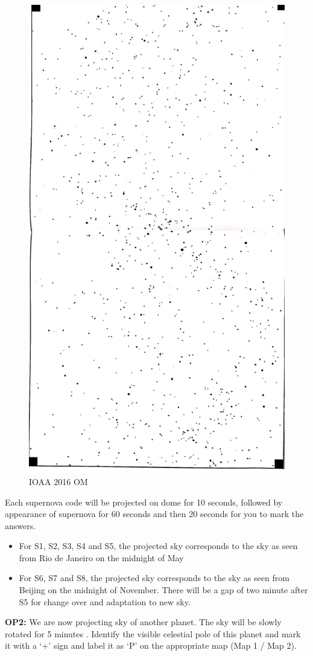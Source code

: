\documentclass[a4paper,12pt]{extarticle}
\begin{document}
\begin{figure}[H]
    \centering
    \includegraphics[width=0.7\linewidth]{IOAA16_OM.jpg}
    \caption{IOAA 2016 OM}
    \label{IOAA16_OM}
\end{figure}

Each supernova code will be projected on dome for 10 seconds, followed by appearance of supernova for 60 seconds and then 20 seconds for you to mark the answers.
\begin{itemize}
    \item For S1, S2, S3, S4 and S5, the projected sky corresponds to the sky as seen from Rio de Janeiro on the midnight of  May
    \item For S6, S7 and S8, the projected sky corresponds to the sky as seen from Beijing on the midnight of  November. There will be a gap of two minute after S5 for change over and adaptation to new sky.
\end{itemize}
\textbf{OP2:} We are now projecting sky of another planet. The sky will be slowly rotated for 5 minutes . Identify the visible celestial pole of this planet and mark it with a ‘+’ sign and label it as ‘P’ on the appropriate map (Map 1 / Map 2).
\end{document}

